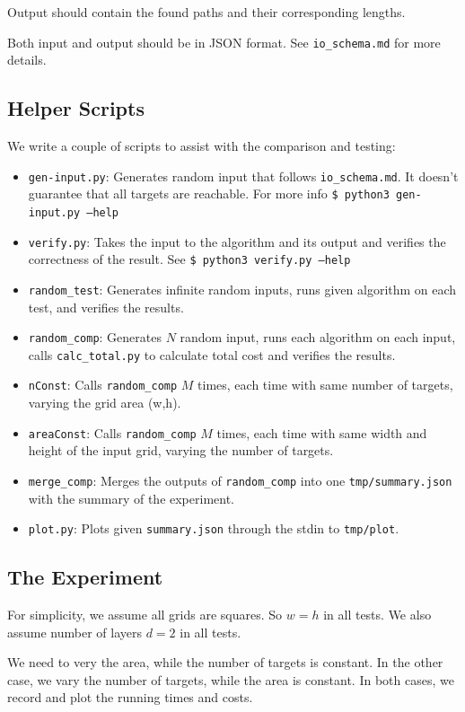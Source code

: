 Output should contain the found paths and their corresponding lengths.

Both input and output should be in JSON format. See \texttt{io\_schema.md} for more details.

\subsection{Helper Scripts}
We write a couple of scripts to assist with the comparison and testing:
\begin{itemize}
    \item \texttt{gen-input.py}: Generates random input that follows \texttt{io\_schema.md}. It doesn't guarantee that all targets are reachable. For more info \texttt{\$ python3 gen-input.py --help}
    \item \texttt{verify.py}: Takes the input to the algorithm and its output and verifies the correctness of the result. See \texttt{\$ python3 verify.py --help}
    \item \texttt{random\_test}: Generates infinite random inputs, runs given algorithm on each test, and verifies the results.
    \item \texttt{random\_comp}: Generates $N$ random input, runs each algorithm on each input, calls \texttt{calc\_total.py} to calculate total cost and verifies the results.
    \item \texttt{nConst}: Calls \texttt{random\_comp} $M$ times, each time with same number of targets, varying the grid area (w,h).
    \item \texttt{areaConst}: Calls \texttt{random\_comp} $M$ times, each time with same width and height of the input grid, varying the number of targets.
    \item \texttt{merge\_comp}: Merges the outputs of \texttt{random\_comp} into one \texttt{tmp/summary.json} with the summary of the experiment.
    \item \texttt{plot.py}: Plots given \texttt{summary.json} through the stdin to \texttt{tmp/plot}.
\end{itemize}

\subsection{The Experiment}
For simplicity, we assume all grids are squares. So $w=h$ in all tests.
We also assume number of layers $d=2$ in all tests.

We need to very the area, while the number of targets is constant. In the other case, we vary the number of targets, while the area is constant.
In both cases, we record and plot the running times and costs.

